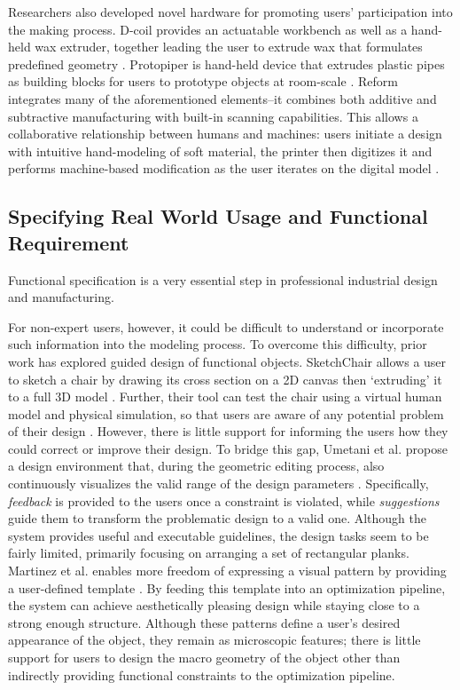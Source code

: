 Researchers also developed novel hardware for promoting users' participation into the making process. D-coil provides an actuatable workbench as well as a hand-held wax extruder, together leading the user to extrude wax that formulates predefined geometry \cite{peng2015d}. Protopiper is hand-held device that extrudes plastic pipes as building blocks for users to prototype objects at room-scale \cite{agrawal2015protopiper}. Reform integrates many of the aforementioned elements--it combines both additive and subtractive manufacturing with built-in scanning capabilities. This allows a collaborative relationship between humans and machines: users initiate a design with intuitive hand-modeling of soft material, the printer then digitizes it and performs machine-based modification as the user iterates on the digital model \cite{weichel2015reform}.


\subsection{Specifying Real World Usage and Functional Requirement}
Functional specification is a very essential step in professional industrial design and manufacturing.

For non-expert users, however, it could be difficult to understand or incorporate such information into the modeling process. To overcome this difficulty, prior work has explored guided design of functional objects. SketchChair allows a user to sketch a chair by drawing its cross section on a 2D canvas then `extruding' it to a full 3D model \cite{saul2011sketchchair}. Further, their tool can test the chair using a virtual human model and physical simulation, so that users are aware of any potential problem of their design \cite{saul2011sketchchair}. However, there is little support for informing the users how they could correct or improve their design. To bridge this gap, Umetani et al. propose a design environment that, during the geometric editing process, also continuously visualizes the valid range of the design parameters \cite{umetani2012guided}. Specifically, \textit{feedback} is provided to the users once a constraint is violated, while \textit{suggestions} guide them to transform the problematic design to a valid one. Although the system provides useful and executable guidelines, the design tasks seem to be fairly limited, primarily focusing on arranging a set of rectangular planks. Martinez et al. enables more freedom of expressing a visual pattern by providing a user-defined template \cite{martinez2015structure}. By feeding this template into an optimization pipeline, the system can achieve aesthetically pleasing design while staying close to a strong enough structure. Although these patterns define a user's desired appearance of the object, they remain as microscopic features; there is little support for users to design the macro geometry of the object other than indirectly providing functional constraints to the optimization pipeline.

